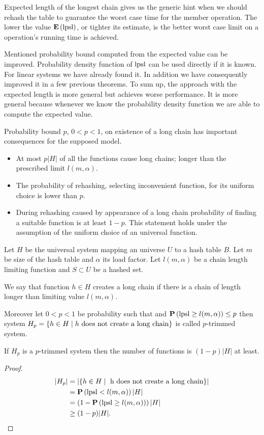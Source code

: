 Expected length of the longest chain gives us the generic hint when we should rehash the table to guarantee the worst case time for the member operation. The lower the value $\mathbf{E}\left(\mathrm{lpsl}\right)$, or tighter its estimate, is the better worst case limit on a operation's running time is achieved.

Mentioned probability bound computed from the expected value can be improved. Probability density function of $\mathrm{lpsl}$ can be used directly if it is known. For linear systems we have already found it. In addition we have consequently improved it in a few previous theorems. To sum up, the approach with the expected length is more general but achieves worse performance. It is more general because whenever we know the probability density function we are able to compute the expected value.

Probability bound $p$, $0 < p < 1$, on existence of a long chain has important consequences for the supposed model.
\begin{itemize}
\item At most $p|H|$ of all the functions cause long chains; longer than the prescribed limit $l(m, \alpha)$. 
\item The probability of rehashing, selecting inconvenient function, for its uniform choice is lower than $p$.
\item During rehashing caused by appearance of a long chain probability of finding a suitable function is at least $1 - p$. This statement holds under the assumption of the uniform choice of an universal function.
\end{itemize}

\begin{definition}
Let $H$ be the universal system mapping an universe $U$ to a hash table $B$. Let $m$ be size of the hash table and $\alpha$ its load factor. Let $l(m, \alpha)$ be a chain length limiting function and $S \subset U$ be a hashed set. 

We say that function $h \in H$ creates a long chain if there is a chain of length longer than limiting value $l(m, \alpha)$.

Moreover let $0 < p < 1$ be probability such that and $\mathbf{P}\left(\mathrm{lpsl} \geq l(m, \alpha)\right) \leq p$ then system $H_p = \{ h \in H \mid h \text{ does not create a long chain} \}$ is called $p$-trimmed system.
\end{definition}

\begin{lemma}
\label{lemma-size-of-trimmed-system}
If $H_p$ is a $p$-trimmed system then the number of functions is $(1 - p)|H|$ at least.
\end{lemma}
\begin{proof}
\[
\begin{split}
|H_p|
	& = |\lbrace h \in H \mid \text{ h does not create a long chain} \rbrace| \\
	& =\mathbf{P}\left(\mathrm{lpsl} < l(m, \alpha)\right) |H| \\
	& = \left(1 - \mathbf{P}\left(\mathrm{lpsl} \geq l(m, \alpha)\right)\right) |H| \\
	& \geq (1 - p)|H| \text{.}
\end{split}
\]
\end{proof}

